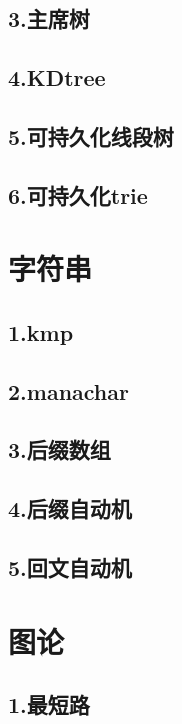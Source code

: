 \documentclass[UTF8,a4paper]{ctexart}
\begin{document}
\subsection{3.主席树}

\subsection{4.KDtree}

\subsection{5.可持久化线段树}

\subsection{6.可持久化trie}

\section{字符串}

\subsection{1.kmp}

\subsection{2.manachar}

\subsection{3.后缀数组}

\subsection{4.后缀自动机}

\subsection{5.回文自动机}

\section{图论}

\subsection{1.最短路}
\end{document}
